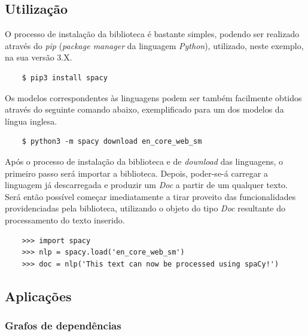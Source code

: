 \documentclass[12pt]{article}
\begin{document}
\subsection{Utilização} %

O processo de instalação da biblioteca é bastante simples, podendo ser realizado através do \textit{pip} (\textit{package manager} da linguagem \textit{Python}), utilizado, neste
exemplo, na sua versão 3.X.

\begin{verbatim}
	$ pip3 install spacy
\end{verbatim}

Os modelos correspondentes às linguagens podem ser também facilmente obtidos através do seguinte comando abaixo, exemplificado para um dos modelos da língua inglesa.

\begin{verbatim}
	$ python3 -m spacy download en_core_web_sm
\end{verbatim}

Após o processo de instalação da biblioteca e de \textit{download} das linguagens, o primeiro passo será importar a biblioteca. Depois, poder-se-á carregar a linguagem já
descarregada e produzir um \textit{Doc} a partir de um qualquer texto. Será então possível começar imediatamente a tirar proveito das funcionalidades providenciadas pela biblioteca,
utilizando o objeto do tipo \textit{Doc} resultante do processamento do texto inserido.

\begin{verbatim}
	>>> import spacy
	>>> nlp = spacy.load('en_core_web_sm')
	>>> doc = nlp('This text can now be processed using spaCy!')
\end{verbatim}


\subsection{Aplicações}



\subsubsection{Grafos de dependências}
\end{document}
